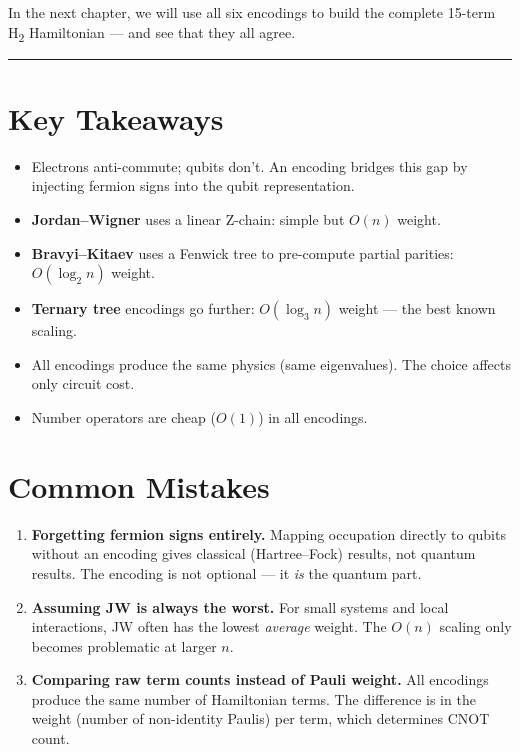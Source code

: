 \documentclass[
  11pt,
  oneside]{book}
\providecommand{\tightlist}{%
  \setlength{\itemsep}{0pt}\setlength{\parskip}{0pt}}
\begin{document}
In the next chapter, we will use all six encodings to build the complete
15-term H\textsubscript{2} Hamiltonian --- and see that they all agree.

\begin{center}\rule{0.5\linewidth}{0.5pt}\end{center}

\section{Key Takeaways}\label{key-takeaways-4}

\begin{itemize}
\tightlist
\item
  Electrons anti-commute; qubits don't. An encoding bridges this gap by
  injecting fermion signs into the qubit representation.
\item
  \textbf{Jordan--Wigner} uses a linear Z-chain: simple but \(O(n)\)
  weight.
\item
  \textbf{Bravyi--Kitaev} uses a Fenwick tree to pre-compute partial
  parities: \(O(\log_2 n)\) weight.
\item
  \textbf{Ternary tree} encodings go further: \(O(\log_3 n)\) weight ---
  the best known scaling.
\item
  All encodings produce the same physics (same eigenvalues). The choice
  affects only circuit cost.
\item
  Number operators are cheap (\(O(1)\)) in all encodings.
\end{itemize}

\section{Common Mistakes}\label{common-mistakes-4}

\begin{enumerate}
\def\labelenumi{\arabic{enumi}.}
\item
  \textbf{Forgetting fermion signs entirely.} Mapping occupation
  directly to qubits without an encoding gives classical (Hartree--Fock)
  results, not quantum results. The encoding is not optional --- it
  \emph{is} the quantum part.
\item
  \textbf{Assuming JW is always the worst.} For small systems and local
  interactions, JW often has the lowest \emph{average} weight. The
  \(O(n)\) scaling only becomes problematic at larger \(n\).
\item
  \textbf{Comparing raw term counts instead of Pauli weight.} All
  encodings produce the same number of Hamiltonian terms. The difference
  is in the weight (number of non-identity Paulis) per term, which
  determines CNOT count.
\end{enumerate}
\end{document}
